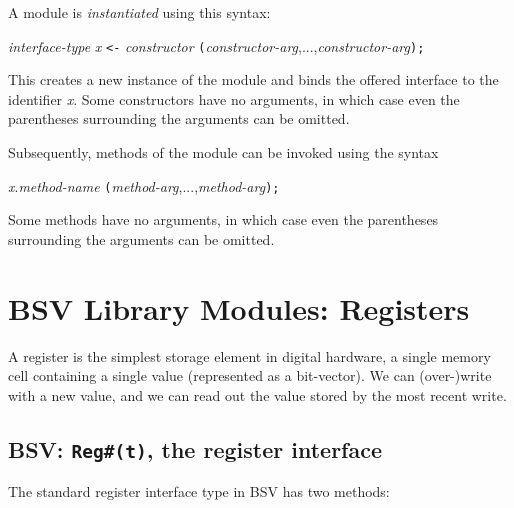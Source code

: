 
A module is \emph{instantiated} using this syntax:

\hm \emph{interface-type} \emph{x} {\tt <-} \emph{constructor} {\tt (}\emph{constructor-arg},...,\emph{constructor-arg}{\tt );}

This creates a new instance of the module and binds the offered
interface to the identifier \emph{x}.  Some constructors have no
arguments, in which case even the parentheses surrounding the
arguments can be omitted.

Subsequently, methods of the module can be invoked using the syntax


\hmmmm \emph{x}.\emph{method-name} {\tt (}\emph{method-arg},...,\emph{method-arg}{\tt );}

Some methods have no arguments, in which case even the parentheses
surrounding the arguments can be omitted.


\section{BSV Library Modules: Registers}


A register is the simplest storage element in digital hardware, a
single memory cell containing a single value (represented as a
bit-vector).  We can (over-)write with a new value, and we can read
out the value stored by the most recent write.


\subsection{BSV: {\tt Reg\#(t)}, the register interface}

\label{Sec_Register_interface}


The standard register interface type in BSV has two methods:

